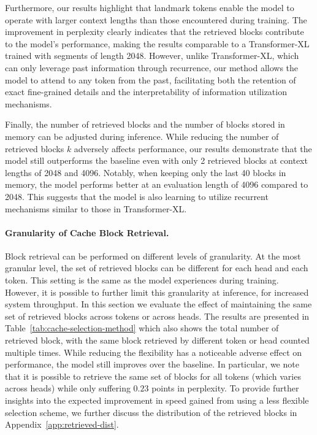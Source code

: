 Furthermore, our results highlight that landmark tokens enable the model to operate with larger context lengths than those encountered during training. The improvement in perplexity clearly indicates that the retrieved blocks contribute to the model's performance, making the results comparable to a Transformer-XL trained with segments of length 2048. However, unlike Transformer-XL, which can only leverage past information through recurrence, our method allows the model to attend to any token from the past, facilitating both the retention of exact fine-grained details and the interpretability of information utilization mechanisms.

Finally, the number of retrieved blocks and the number of blocks stored in memory can be adjusted during inference. While reducing the number of retrieved blocks $k$ adversely affects performance, our results demonstrate that the model still outperforms the baseline even with only 2 retrieved blocks at context lengths of 2048 and 4096. Notably, when keeping only the last 40 blocks in memory, the model performs better at an evaluation length of 4096 compared to 2048. This suggests that the model is also learning to utilize recurrent mechanisms similar to those in Transformer-XL.

\paragraph{Granularity of Cache Block Retrieval.}
\label{sec:exp-cache-selection-method}
Block retrieval can be performed on different levels of granularity. At the most granular level, the set of retrieved blocks can be different for each head and each token. This setting is the same as the model experiences during training. However, it is possible to further limit this granularity at inference, for increased system throughput. In this section we evaluate the effect of maintaining the same set of retrieved blocks across tokens or across heads. The results are presented in Table~\ref{tab:cache-selection-method} which also shows the total number of retrieved block, with the same block retrieved by different token or head counted multiple times. While reducing the flexibility has a noticeable adverse effect on performance, the model still improves over the baseline. In particular, we note that it is possible to retrieve the same set of blocks for all tokens (which varies across heads) while only suffering $0.23$ points in perplexity.  To provide further insights into the expected improvement in speed gained from using a less flexible selection scheme, we further discuss the distribution of the retrieved blocks in Appendix~\ref{app:retrieved-dist}. 

